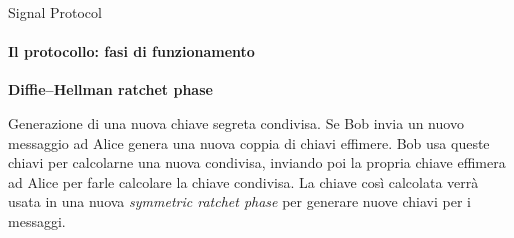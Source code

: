 \begin{frame}{Signal Protocol}
    \framesubtitle{Il protocollo: fasi di funzionamento}
    \textbf{Diffie–Hellman ratchet phase}\newline

    Generazione di una nuova chiave segreta condivisa.\newline\pause
    Se Bob invia un nuovo messaggio ad Alice genera una nuova coppia di chiavi effimere. Bob usa queste chiavi per calcolarne una nuova condivisa, inviando poi la propria chiave effimera ad Alice per farle calcolare la chiave condivisa.\newline\pause
    La chiave così calcolata verrà usata in una nuova \textit{symmetric ratchet phase} per generare nuove chiavi per i messaggi.

\end{frame}